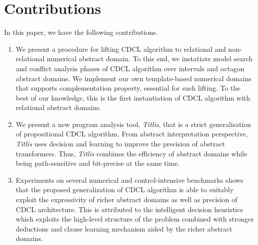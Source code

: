 \section{Contributions}
In this paper, we have the following contributions.
\begin{enumerate}
\item We present a procedure for lifting CDCL algorithm to 
relational and non-relational numerical abstract domain.  
To this end, we instatiate model search and conflict analysis 
phases of CDCL algorithm over intervals and octagon abstract 
domains.  We implement our own template-based numerical 
domains that supports complementation property, essential for 
such lifting.  To the best of our knowledge, this is the first 
instantiation of CDCL algorithm with relational abstract domains. 
 
\item We present a new program analysis tool, {\em Titlis}, that 
is a strict generalisation of propositional CDCL algorithm.  From 
abstract interpretation perspective, {\em Titlis} uses decision 
and learning to improve the precision of abstract transformers.  
Thus, {\em Titlis} combines the efficiency of abstract domains 
while being path-sensitive and bit-precise at the same time.   
   
\item  Experiments on several numerical and control-intensive benchmarks 
shows that the proposed generalization of CDCL algorithm is able to 
suitably exploit the expressivity of richer abstract domains as well 
as precision of CDCL architecture.  This is attributed to the 
intelligent decision heuristics which exploits the high-level 
structure of the problem combined with stronger deductions and 
clause learning mechanism aided by the richer abstract domains.
\end{enumerate}
